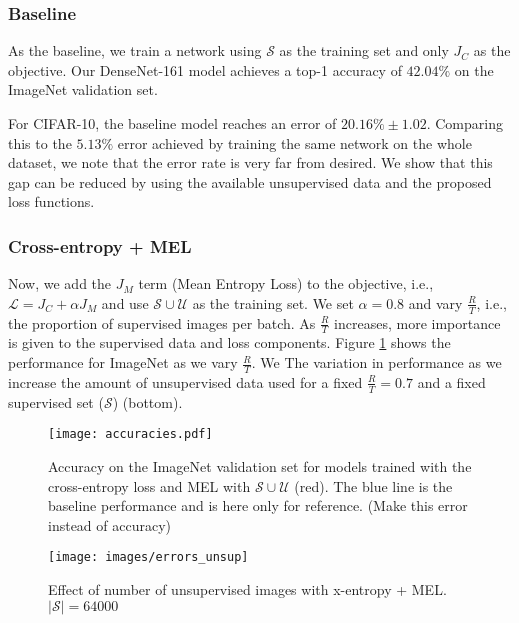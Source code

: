 \subsubsection{Baseline}
As the baseline, we train a network using $\mathcal{S}$ as the training set and only $J_C$ as the
objective. Our DenseNet-161 model achieves a top-1 accuracy of $42.04\%$ on the ImageNet validation
set. 

For CIFAR-10, the baseline model reaches an error of $20.16\% \pm 1.02$. Comparing this to the $5.13\%$
error achieved by training the same network on the whole dataset, we note that the error rate is
very far from desired. We show that this gap can be reduced by using the available unsupervised data and
the proposed loss functions.  

\subsubsection{Cross-entropy + MEL}
Now, we add the $J_M$ term (Mean Entropy Loss) to the objective, i.e., $\mathcal{L} = J_C + \alpha
J_M$ and use $\mathcal{S} \cup \mathcal{U}$ as the training set. We set $\alpha = 0.8$ and vary
$\frac{R}{T}$, i.e., the proportion of supervised images per batch. As $\frac{R}{T}$ increases, more
importance is given to the supervised data and loss components. Figure \ref{fig:acc} shows
the performance for ImageNet as we vary $\frac{R}{T}$. We The variation in performance as we
increase the amount of unsupervised data used for a fixed $\frac{R}{T} = 0.7$ and a fixed supervised
set ($\mathcal{S}$) (bottom). 
\begin{figure}
	\centering
		\texttt{[image: accuracies.pdf]}
		\caption{Accuracy on the ImageNet validation set for models trained with the cross-entropy
		loss and MEL with $\mathcal{S}\cup\mathcal{U}$ (red). The blue line is the baseline
	performance and is here only for reference. (Make this error instead of accuracy)}
		\label{fig:acc}
\end{figure}


\begin{figure}
	\centering
	\texttt{[image: images/errors\_unsup]}
	\caption{Effect of number of unsupervised images with x-entropy + MEL. $|\mathcal{S}|	=
	64000$}
	\label{fig:err_unsup}
\end{figure}


